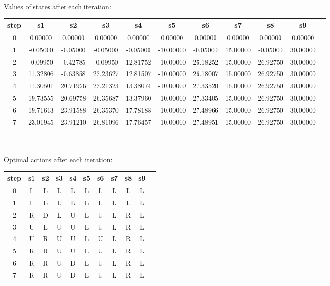 \documentclass{article}
\begin{document}
Values of states after each iteration:\\
\begin{tabular}{|c|c|c|c|c|c|c|c|c|c|c|}
\hline
 step & s1 & s2 & s3 & s4 & s5 & s6 & s7 & s8 & s9 \\
\hline
0 & 0.00000 & 0.00000 & 0.00000 & 0.00000 & 0.00000 & 0.00000 & 0.00000 & 0.00000 & 0.00000 \\
\hline
1 & -0.05000 & -0.05000 & -0.05000 & -0.05000 & -10.00000 & -0.05000 & 15.00000 & -0.05000 & 30.00000 \\
\hline
2 & -0.09950 & -0.42785 & -0.09950 & 12.81752 & -10.00000 & 26.18252 & 15.00000 & 26.92750 & 30.00000 \\
\hline
3 & 11.32806 & -0.63858 & 23.23627 & 12.81507 & -10.00000 & 26.18007 & 15.00000 & 26.92750 & 30.00000 \\
\hline
4 & 11.30501 & 20.71926 & 23.21323 & 13.38074 & -10.00000 & 27.33520 & 15.00000 & 26.92750 & 30.00000 \\
\hline
5 & 19.73555 & 20.69758 & 26.35687 & 13.37960 & -10.00000 & 27.33405 & 15.00000 & 26.92750 & 30.00000 \\
\hline
6 & 19.71613 & 23.91588 & 26.35370 & 17.78188 & -10.00000 & 27.48966 & 15.00000 & 26.92750 & 30.00000 \\
\hline
7 & 23.01945 & 23.91210 & 26.81096 & 17.76457 & -10.00000 & 27.48951 & 15.00000 & 26.92750 & 30.00000 \\
\hline

\end{tabular} \\ \\
Optimal actions after each iteration:\\
\begin{tabular}{|c|c|c|c|c|c|c|c|c|c|c|}
    \hline
     step & s1 & s2 & s3 & s4 & s5 & s6 & s7 & s8 & s9 \\
    \hline
    0 &L & L & L & L & L & L & L & L & L \\\hline
    1 & L & L & L & L & L & L & L & L & L \\\hline
    2 & R & D & L & U & L & U & L & R & L \\\hline
    3 & U & L & U & U & L & U & L & R & L \\\hline
    4 & U & R & U & U & L & U & L & R & L \\\hline
    5 & R & R & U & U & L & U & L & R & L \\\hline
    6 & R & R & U & D & L & U & L & R & L \\\hline
    7 & R & R & U & D & L & U & L & R & L \\\hline
    \end{tabular}\\ \\
\end{document}
